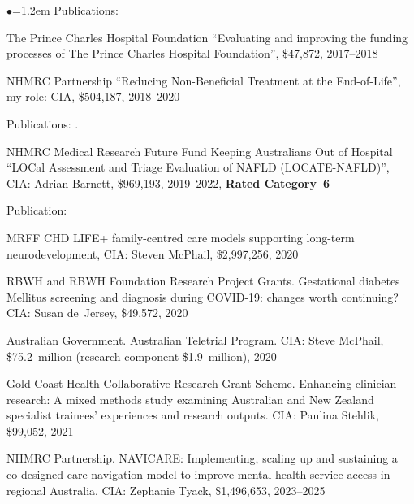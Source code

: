 \documentclass[a4paper,11pt]{article}
\renewcommand{\labelitemi}{$\bullet$}
\begin{document}
\begin{raggedright}
\begin{list}{\labelitemi}{\leftmargin=1.2em}
   Publications: 

\item The Prince Charles Hospital Foundation ``Evaluating and improving the funding processes of The Prince Charles Hospital Foundation'', \$47,872, 2017--2018

\item NHMRC Partnership ``Reducing Non-Beneficial Treatment at the End-of-Life'', my role: CIA, \$504,187, 2018--2020

Publications: .

\item NHMRC Medical Research Future Fund Keeping Australians Out of Hospital ``LOCal Assessment and Triage Evaluation of NAFLD (LOCATE-NAFLD)'', CIA: Adrian Barnett, \$969,193, 2019--2022, \textbf{Rated Category~6}

Publication: 

\item MRFF CHD LIFE+ family-centred care models supporting long-term neurodevelopment, CIA: Steven McPhail, \$2,997,256, 2020

\item RBWH and RBWH Foundation Research Project Grants. Gestational diabetes Mellitus screening and diagnosis during COVID-19: changes worth continuing? CIA: Susan de~Jersey, \$49,572, 2020

\item Australian Government. Australian Teletrial Program. CIA: Steve McPhail, \$75.2~million (research component \$1.9~million), 2020

\item Gold Coast Health Collaborative Research Grant Scheme. Enhancing clinician research: A mixed methods study examining Australian and New Zealand specialist trainees' experiences and research outputs. CIA: Paulina Stehlik, \$99,052, 2021 

\item NHMRC Partnership. NAVICARE: Implementing, scaling up and sustaining a co-designed care navigation model to improve mental health service access in regional Australia. CIA: Zephanie Tyack, \$1,496,653, 2023--2025


\end{list}



\end{raggedright}
\end{document}
